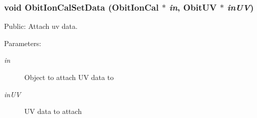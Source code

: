 \subsubsection{\setlength{\rightskip}{0pt plus 5cm}void Obit\-Ion\-Cal\-Set\-Data ({\bf Obit\-Ion\-Cal} $\ast$ {\em in}, {\bf Obit\-UV} $\ast$ {\em in\-UV})}\label{ObitIonCal_8h_a10}


Public: Attach uv data. 

\begin{Desc}
\item[Parameters:]
\begin{description}
\item[{\em in}]Object to attach UV data to \item[{\em in\-UV}]UV data to attach \end{description}
\end{Desc}
